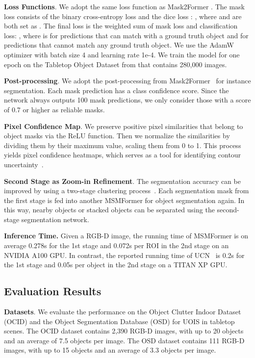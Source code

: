\documentclass[letterpaper, 10 pt, conference]{ieeeconf}
\begin{document}
\textbf{Loss Functions}. We adopt the same loss function as Mask2Former \cite{cheng2022masked}. The mask loss consists of the binary cross-entropy loss and the dice loss \cite{milletari2016v}: , where   and  are both set as . The final loss is the weighted sum of mask loss and classification loss: , where  is  for predictions that can match with a ground truth object and  for predictions that cannot match any ground truth object. We use the AdamW optimizer \cite{loshchilov2017decoupled} with batch size 4 and learning rate 1e-4. We train the model for one epoch on the Tabletop Object Dataset from \cite{xie2020best} that contains 280,000 images. 

\textbf{Post-processing}. We adopt the post-processing from Mask2Former~\cite{cheng2022masked} for instance segmentation. Each mask prediction has a class confidence score. Since the network always outputs 100 mask predictions, we only consider those with a score of 0.7 or higher as reliable masks. 

\textbf{Pixel Confidence Map}. We preserve positive pixel similarities that belong to object masks via the ReLU function. Then we normalize the similarities by dividing them by their maximum value, scaling them from 0 to 1. This process yields pixel confidence heatmaps, which serves as a tool for identifying contour uncertainty~\cite{xie2022rice}.

\textbf{Second Stage as Zoom-in Refinement}. The segmentation accuracy can be improved by using a two-stage clustering process~\cite{xiang2020learning}. Each segmentation mask from the first stage is fed into another MSMFormer for object segmentation again. In this way, nearby objects or stacked objects can be separated using the second-stage segmentation network.

\textbf{Inference Time.} Given a  RGB-D image, the running time of MSMFormer is on average 0.278s for the 1st stage and 0.072s per ROI in the 2nd stage on an NVIDIA A100 GPU. In contrast, the reported running time of UCN~\cite{xiang2020learning} is 0.2s for the 1st stage and 0.05s per object in the 2nd stage on a TITAN XP GPU. 

\subsection{Evaluation Results}


\textbf{Datasets}. We evaluate the performance on the Object Clutter Indoor Dataset (OCID) \cite{suchi2019easylabel} and the Object Segmentation Database (OSD) \cite{richtsfeld2012segmentation} for UOIS in tabletop scenes. The OCID dataset contains 2,390 RGB-D images, with up to 20 objects and an average of 7.5 objects per image. The OSD dataset contains 111 RGB-D images, with up to 15 objects and an average of 3.3 objects per image. 
\end{document}
